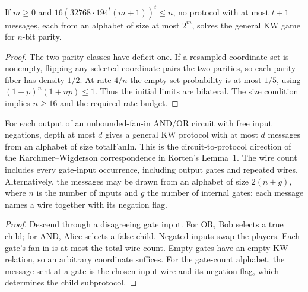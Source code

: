 \begin{theorem}
  \label{thm:lowerbounds-parity-topdown-finite}
  \leanok
  If $m\ge0$ and
  $16(32768\cdot194^t(m+1))^t\le n$, no protocol with at most $t+1$
  messages, each from an alphabet of size at most $2^m$, solves the
  general KW game for $n$-bit parity.
\end{theorem}
\begin{proof}
  \leanok
  The two parity classes have deficit one. If a resampled coordinate
  set is nonempty, flipping any selected coordinate pairs the two
  parities, so each parity fiber has density $1/2$. At rate $4/n$ the
  empty-set probability is at most $1/5$, using
  $(1-p)^n(1+np)\le1$. Thus the initial limits are bilateral.
  The size condition implies $n\ge16$ and the required rate budget.
\end{proof}

\begin{theorem}
  \label{thm:lowerbounds-circuit-round-protocol}
  \leanok
  For each output of an unbounded-fan-in AND/OR circuit with free
  input negations, depth at most $d$ gives a general KW protocol with
  at most $d$ messages from an alphabet of size $\mathrm{totalFanIn}$.
  This is the circuit-to-protocol direction of the Karchmer--Wigderson
  correspondence in Korten's Lemma~1. The wire count includes every
  gate-input occurrence, including output gates and repeated wires.
  Alternatively, the messages may be drawn from an alphabet of size
  $2(n + g)$, where $n$ is the number of inputs and $g$ the number of internal
  gates: each message names a wire together with its negation flag.
\end{theorem}
\begin{proof}
  \leanok
  Descend through a disagreeing gate input. For OR, Bob selects a true
  child; for AND, Alice selects a false child. Negated inputs swap the
  players. Each gate's fan-in is at most the total wire count. Empty
  gates have an empty KW relation, so an arbitrary coordinate suffices.
  For the gate-count alphabet, the message sent at a gate is the chosen input
  wire and its negation flag, which determines the child subprotocol.
\end{proof}

